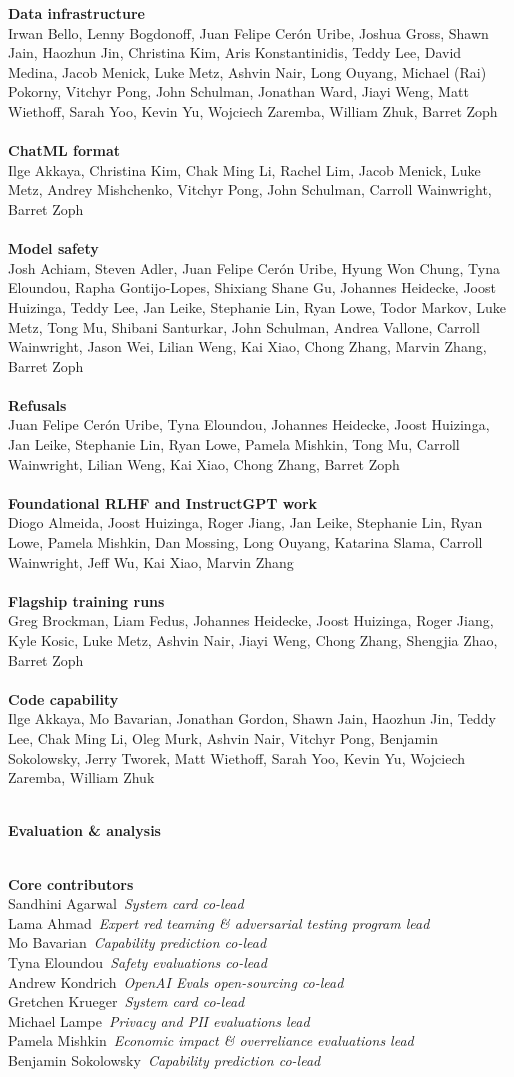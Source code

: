 \documentclass{article}
\newcommand{\creditsectionheader}[1]{\parbox{\columnwidth}{\centering \textbf{\small #1}}\\}
\newcommand{\creditlistheader}[1]{\textbf{#1}\footnotemark[\thefootnote]\\}
\newcommand{\creditlist}[2]{\creditlistheader{#1}#2\\
\\}
\newcommand{\corecontributor}[2]{#1\ \textit{#2}\\}
\begin{document}
\begin{multicols}{2}
\creditlist{Data infrastructure}{Irwan Bello, Lenny Bogdonoff, Juan Felipe Cerón Uribe, Joshua Gross, Shawn Jain, Haozhun Jin, Christina Kim, Aris Konstantinidis, Teddy Lee, David Medina, Jacob Menick, Luke Metz, Ashvin Nair, Long Ouyang, Michael (Rai) Pokorny, Vitchyr Pong, John Schulman, Jonathan Ward, Jiayi Weng, Matt Wiethoff, Sarah Yoo, Kevin Yu, Wojciech Zaremba, William Zhuk, Barret Zoph}
\creditlist{ChatML format}{Ilge Akkaya, Christina Kim, Chak Ming Li, Rachel Lim, Jacob Menick, Luke Metz, Andrey Mishchenko, Vitchyr Pong, John Schulman, Carroll Wainwright, Barret Zoph}
\creditlist{Model safety}{Josh Achiam, Steven Adler, Juan Felipe Cerón Uribe, Hyung Won Chung, Tyna Eloundou, Rapha Gontijo-Lopes, Shixiang Shane Gu, Johannes Heidecke, Joost Huizinga, Teddy Lee, Jan Leike, Stephanie Lin, Ryan Lowe, Todor Markov, Luke Metz, Tong Mu, Shibani Santurkar, John Schulman, Andrea Vallone, Carroll Wainwright, Jason Wei, Lilian Weng, Kai Xiao, Chong Zhang, Marvin Zhang, Barret Zoph}
\creditlist{Refusals}{Juan Felipe Cerón Uribe, Tyna Eloundou, Johannes Heidecke, Joost Huizinga, Jan Leike, Stephanie Lin, Ryan Lowe, Pamela Mishkin, Tong Mu, Carroll Wainwright, Lilian Weng, Kai Xiao, Chong Zhang, Barret Zoph}
\creditlist{Foundational RLHF and InstructGPT work}{Diogo Almeida, Joost Huizinga, Roger Jiang, Jan Leike, Stephanie Lin, Ryan Lowe, Pamela Mishkin, Dan Mossing, Long Ouyang, Katarina Slama, Carroll Wainwright, Jeff Wu, Kai Xiao, Marvin Zhang}
\creditlist{Flagship training runs}{Greg Brockman, Liam Fedus, Johannes Heidecke, Joost Huizinga, Roger Jiang, Kyle Kosic, Luke Metz, Ashvin Nair, Jiayi Weng, Chong Zhang, Shengjia Zhao, Barret Zoph}
\creditlist{Code capability}{Ilge Akkaya, Mo Bavarian, Jonathan Gordon, Shawn Jain, Haozhun Jin, Teddy Lee, Chak Ming Li, Oleg Murk, Ashvin Nair, Vitchyr Pong, Benjamin Sokolowsky, Jerry Tworek, Matt Wiethoff, Sarah Yoo, Kevin Yu, Wojciech Zaremba, William Zhuk}
\creditsectionheader{Evaluation \& analysis}
\creditlistheader{Core contributors}
\corecontributor{Sandhini Agarwal}{System card co-lead}
\corecontributor{Lama Ahmad}{Expert red teaming \& adversarial testing program lead}
\corecontributor{Mo Bavarian}{Capability prediction co-lead}
\corecontributor{Tyna Eloundou}{Safety evaluations co-lead}
\corecontributor{Andrew Kondrich}{OpenAI Evals open-sourcing co-lead}
\corecontributor{Gretchen Krueger}{System card co-lead}
\corecontributor{Michael Lampe}{Privacy and PII evaluations lead}
\corecontributor{Pamela Mishkin}{Economic impact \& overreliance evaluations lead}
\corecontributor{Benjamin Sokolowsky}{Capability prediction co-lead}

\end{multicols}
\end{document}
